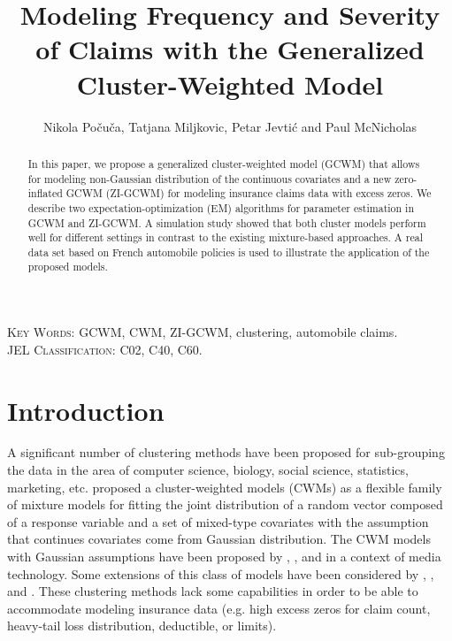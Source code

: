 \documentclass[11pt,letterpaper]{article}
\numberwithin{equation}{section}
\numberwithin{equation}{section}
\numberwithin{equation}{section}
\begin{document}
\title{\bf Modeling  Frequency and Severity of Claims with the Generalized  Cluster-Weighted Model}

\author{Nikola Po\v cu\v ca, Tatjana Miljkovic,  Petar Jevti\' c and Paul McNicholas  }%

\maketitle
\doublespacing
\small

\begin{abstract}

In this paper, we propose a generalized cluster-weighted model (GCWM) that allows for modeling non-Gaussian distribution of the continuous covariates and a new zero-inflated GCWM (ZI-GCWM) for modeling insurance claims data with excess zeros. We describe two expectation-optimization (EM) algorithms for parameter estimation in GCWM and ZI-GCWM. A simulation study showed that both cluster models perform well for different settings in contrast to the existing mixture-based approaches. A real data set based on French automobile policies is used to illustrate the application of the proposed models.

\end{abstract}
\textsc{Key Words:} GCWM, CWM, ZI-GCWM, clustering, automobile claims.\\
\textsc{JEL Classification:}  C02, C40, C60.\\
\section{Introduction}\label{sec:introduction}
A significant number of clustering methods have been proposed for sub-grouping the data in the area of computer science, biology, social science, statistics, marketing, etc. \cite{Ingrassia+Punzo+Vittadini+Minotti:2015} proposed a cluster-weighted models (CWMs) as a flexible family of mixture models for fitting the joint distribution of a random vector composed of a response variable and a set of mixed-type covariates with the assumption that continues covariates come from Gaussian distribution. The CWM models with Gaussian assumptions have been proposed by \cite{Gershenfeld:1997}, \cite{Gershenfeld:Schoner+Metois:1999}, and \cite{Gershenfeld:1999} in a context of media technology. Some extensions of this class of models have been considered by \cite{Punzo+Ingrassia:2015}, \cite{Ingrassia+Minotti+Punzo:2014}, and \cite{Ingrassia+Minotti+Vittadini:2012}. These clustering methods lack some capabilities in order to be able to accommodate modeling insurance data (e.g. high excess zeros for claim count, heavy-tail loss distribution, deductible, or limits).
\end{document}
